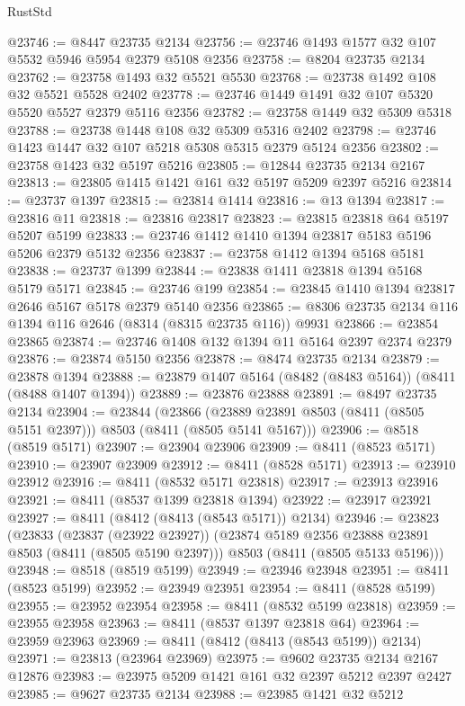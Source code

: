 \begin{lexlean}{RustStd}
\begin{coremodule}
@23746 := @8447 @23735 @2134
@23756 := @23746 @1493 @1577 @32 @107 @5532 @5946 @5954 @2379 @5108 @2356
@23758 := @8204 @23735 @2134
@23762 := @23758 @1493 @32 @5521 @5530
@23768 := @23738 @1492 @108 @32 @5521 @5528 @2402
@23778 := @23746 @1449 @1491 @32 @107 @5320 @5520 @5527 @2379 @5116 @2356
@23782 := @23758 @1449 @32 @5309 @5318
@23788 := @23738 @1448 @108 @32 @5309 @5316 @2402
@23798 := @23746 @1423 @1447 @32 @107 @5218 @5308 @5315 @2379 @5124 @2356
@23802 := @23758 @1423 @32 @5197 @5216
@23805 := @12844 @23735 @2134 @2167
@23813 := @23805 @1415 @1421 @161 @32 @5197 @5209 @2397 @5216
@23814 := @23737 @1397
@23815 := @23814 @1414
@23816 := @13 @1394
@23817 := @23816 @11
@23818 := @23816 @23817
@23823 := @23815 @23818 @64 @5197 @5207 @5199
@23833 := @23746 @1412 @1410 @1394 @23817 @5183 @5196 @5206 @2379 @5132 @2356
@23837 := @23758 @1412 @1394 @5168 @5181
@23838 := @23737 @1399
@23844 := @23838 @1411 @23818 @1394 @5168 @5179 @5171
@23845 := @23746 @199
@23854 := @23845 @1410 @1394 @23817 @2646 @5167 @5178 @2379 @5140 @2356
@23865 := @8306 @23735 @2134 @116 @1394 @116 @2646 (@8314 (@8315 @23735 @116)) @9931
@23866 := @23854 @23865
@23874 := @23746 @1408 @132 @1394 @11 @5164 @2397 @2374 @2379
@23876 := @23874 @5150 @2356
@23878 := @8474 @23735 @2134
@23879 := @23878 @1394
@23888 := @23879 @1407 @5164 (@8482 (@8483 @5164)) (@8411 (@8488 @1407 @1394))
@23889 := @23876 @23888
@23891 := @8497 @23735 @2134
@23904 := @23844
    (@23866 (@23889 @23891 @8503 (@8411 (@8505 @5151 @2397))) @8503 (@8411 (@8505 @5141 @5167)))
@23906 := @8518 (@8519 @5171)
@23907 := @23904 @23906
@23909 := @8411 (@8523 @5171)
@23910 := @23907 @23909
@23912 := @8411 (@8528 @5171)
@23913 := @23910 @23912
@23916 := @8411 (@8532 @5171 @23818)
@23917 := @23913 @23916
@23921 := @8411 (@8537 @1399 @23818 @1394)
@23922 := @23917 @23921
@23927 := @8411 (@8412 (@8413 (@8543 @5171)) @2134)
@23946 := @23823
    (@23833
      (@23837 (@23922 @23927))
      (@23874 @5189 @2356 @23888 @23891 @8503 (@8411 (@8505 @5190 @2397)))
      @8503
      (@8411 (@8505 @5133 @5196)))
@23948 := @8518 (@8519 @5199)
@23949 := @23946 @23948
@23951 := @8411 (@8523 @5199)
@23952 := @23949 @23951
@23954 := @8411 (@8528 @5199)
@23955 := @23952 @23954
@23958 := @8411 (@8532 @5199 @23818)
@23959 := @23955 @23958
@23963 := @8411 (@8537 @1397 @23818 @64)
@23964 := @23959 @23963
@23969 := @8411 (@8412 (@8413 (@8543 @5199)) @2134)
@23971 := @23813 (@23964 @23969)
@23975 := @9602 @23735 @2134 @2167 @12876
@23983 := @23975 @5209 @1421 @161 @32 @2397 @5212 @2397 @2427
@23985 := @9627 @23735 @2134
@23988 := @23985 @1421 @32 @5212

\end{coremodule}
\end{lexlean}
